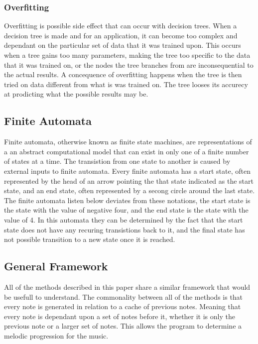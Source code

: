 \documentclass{sig-alternate}
\begin{document}
\subsubsection{Overfitting}
\label{sec:overfitting}
	Overfitting is possible side effect that can occur with decision trees. When a decision tree is made and for an application, it can become too complex and dependant on the particular set of data that it was trained upon. This occurs when a tree gains too many parameters, making the tree too specific to the data that it was trained on, or the nodes the tree branches from are inconsequential to the actual results. A concequence of overfitting  happens when the tree is then tried on data different from what is was trained on. The tree looses its accurecy at prodicting what the possible results may be. 
\subsection{Finite Automata}
\label{sec:finiteautomata}
	Finite automata, otherwise known as finite state machines, are representations of a an abstract computational model that can exist in only one of a finite number of states at a time. The transistion from one state to another is caused by external inputs to finite automata. Every finite automata has a start state, often represented by the head of an arrow pointing the that state indicated as the start state, and an end state, often represented by a secong circle around the last state. The finite automata listen below deviates from these notations, the start state is the state with the value of negative four, and the end state is the state with the value of 4. In this automata they can be determined by the fact that the start state does not have any recuring transistions back to it, and the final state has not possible transition to a new state once it is reached. 
\subsection{General Framework}
\label{sec:framework}
	All of the methods described in this paper share a similar framework that would be usefull to understand. The commonality between all of the methods is that every note is generated in relation to a cache of previous notes. Meaning that every note is dependant upon a set of notes before it, whether it is only the previous note or a larger set of notes. This allows the program to determine a melodic progression for the music. 
\end{document}
